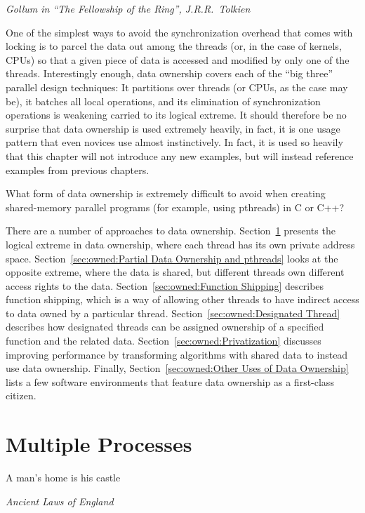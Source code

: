 
%
	 {\emph{Gollum in ``The Fellowship of the Ring'', J.R.R.~Tolkien}}

One of the simplest ways to avoid the synchronization overhead that
comes with locking is to parcel the data out among the threads (or,
in the case of kernels, CPUs)
so that a given piece of data is accessed and modified by only one
of the threads.
Interestingly enough, data ownership covers each of the ``big three''
parallel design techniques:
It partitions over threads (or CPUs, as the case may be),
it batches all local operations,
and its elimination of synchronization operations is weakening
carried to its logical extreme.
It should therefore be no surprise that data ownership is used extremely
heavily, in fact, it is one usage pattern that even novices use almost
instinctively.
In fact, it is used so heavily that this chapter will not introduce
any new examples, but will instead reference examples from previous
chapters.

\QuickQuiz{}
	What form of data ownership is extremely difficult
	to avoid when creating shared-memory parallel programs
	(for example, using pthreads) in C or C++?
 \QuickQuizEnd

There are a number of approaches to data ownership.
Section~\ref{sec:owned:Multiple Processes} presents the logical extreme
in data ownership, where each thread has its own private address space.
Section~\ref{sec:owned:Partial Data Ownership and pthreads} looks at
the opposite extreme, where the data is shared, but different threads
own different access rights to the data.
Section~\ref{sec:owned:Function Shipping} describes function shipping,
which is a way of allowing other threads to have indirect access to
data owned by a particular thread.
Section~\ref{sec:owned:Designated Thread} describes how designated
threads can be assigned ownership of a specified function and the
related data.
Section~\ref{sec:owned:Privatization} discusses improving performance
by transforming algorithms with shared data to instead use data ownership.
Finally, Section~\ref{sec:owned:Other Uses of Data Ownership} lists
a few software environments that feature data ownership as a
first-class citizen.

\section{Multiple Processes}
\label{sec:owned:Multiple Processes}
%
\epigraph{A man's home is his castle}{\emph{Ancient Laws of England}}

